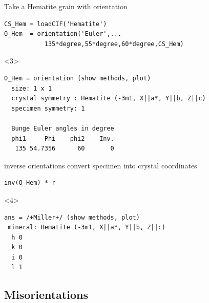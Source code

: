 \documentclass[compress]{beamer}
\begin{document}
\begin{frame}[fragile]
\begin{overlayarea}{\textwidth}{8cm}
  \pause

  Take a Hematite grain with orientation
  \vspace{-0.2cm}
  \begin{lstlisting}[style=input]
CS_Hem = loadCIF('Hematite')
O_Hem  = orientation('Euler',...
           135*degree,55*degree,60*degree,CS_Hem)
   \end{lstlisting}
   \begin{onlyenv}<3>
     \vspace{-0.3cm}
     \begin{lstlisting}[style=output]
O_Hem = orientation (show methods, plot)
  size: 1 x 1
  crystal symmetry : Hematite (-3m1, X||a*, Y||b, Z||c)
  specimen symmetry: 1

  Bunge Euler angles in degree
  phi1     Phi    phi2    Inv.
   135 54.7356      60       0
    \end{lstlisting}
  \end{onlyenv}

  \pause

  inverse orientations convert specimen into crystal coordinates
  \vspace{-.2cm}
  \begin{lstlisting}[style=input]
inv(O_Hem) * r
\end{lstlisting}
  \begin{onlyenv}<4>
    \vspace{-.3cm}
    \begin{lstlisting}[style=output]
ans = /+Miller+/ (show methods, plot)
 mineral: Hematite (-3m1, X||a*, Y||b, Z||c)
  h 0
  k 0
  i 0
  l 1
\end{lstlisting}
  \end{onlyenv}
\end{overlayarea}

\end{frame}



\subsection*{Misorientations}
\label{sec:orientations2}
\end{document}
